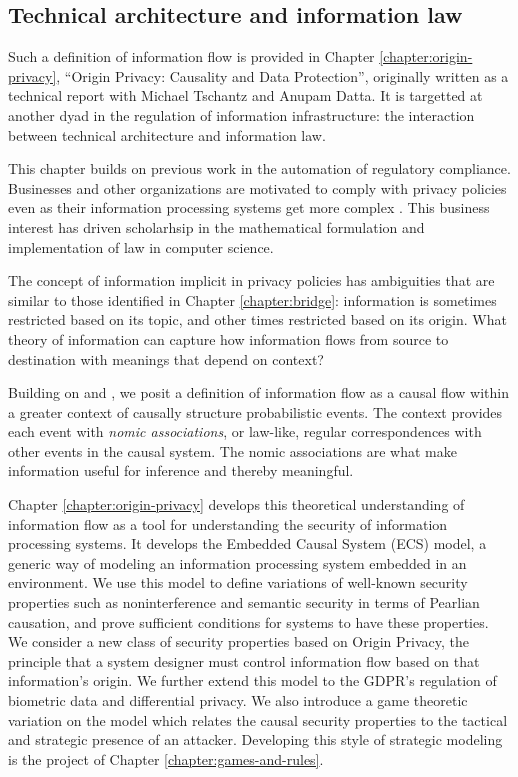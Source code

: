 \documentclass[../thesis.tex]{subfiles}
\begin{document}
 \subsection{Technical architecture and information law}

 Such a definition of information flow is provided in
 Chapter \ref{chapter:origin-privacy},
 ``Origin Privacy: Causality and Data Protection'', originally
 written as a technical report
 with Michael Tschantz and Anupam Datta. 
 It is targetted at another dyad in the regulation of information
 infrastructure: the interaction between technical architecture
 and information law.

 This chapter builds on previous work in the automation of
 regulatory compliance.
 Businesses and other organizations are motivated to comply
 with privacy policies even as their information
 processing systems get more complex \cite{barth2007privacy}
 \cite{deyoung2010experiences} \cite{sen2014bootstrapping}.
 This business interest has driven scholarhsip in the
 mathematical formulation and implementation of law
 in computer science.

 The concept of information implicit in privacy policies
 has ambiguities that are similar to those identified
 in Chapter \ref{chapter:bridge}: information is sometimes
 restricted based on its topic, and other times restricted
 based on its origin.
 What theory of information can capture how information
 flows from source to destination with meanings that depend
 on context?

 Building on \citet{dretske1981knowledge}
 and \citet{pearl2009causality}, we posit a definition
 of information flow as a causal flow within a greater
 context of causally structure probabilistic events.
 The context provides each event with
 \textit{nomic associations}, or law-like, regular
 correspondences with other events in the causal system.
 The nomic associations are what make information useful
 for inference and thereby meaningful.

 Chapter \ref{chapter:origin-privacy} develops this
 theoretical understanding of information flow as a
 tool for understanding the security of information processing
 systems.
 It develops the Embedded Causal System (ECS) model,
 a generic way of modeling an information processing system
 embedded in an environment.
 We use this model to define variations of well-known
 security properties such as noninterference and semantic
 security in terms of Pearlian causation,
 and prove sufficient conditions for systems to have these
 properties.
 We consider a new class of security properties based on
 Origin Privacy, the principle that a system designer
 must control information flow based on that information's
 origin.
 We further extend this model to the GDPR's regulation of
 biometric data and differential privacy.
 We also introduce a game theoretic variation on the model
 which relates the causal security properties to the tactical
 and strategic presence of an attacker.
 Developing this style of strategic modeling is the
 project of Chapter \ref{chapter:games-and-rules}.
\end{document}
